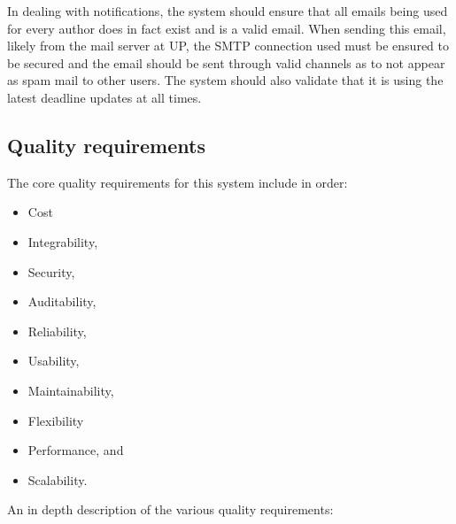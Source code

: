 \documentclass{article}
\begin{document}
	\par In dealing with notifications, the system should ensure that all emails being used for every author does in fact exist and is a valid email. When sending this email, likely from the mail server at UP, the SMTP connection used must be ensured to be secured and the email should be sent through valid channels as to not appear as spam mail to other users. The system should also validate that it is using the latest deadline updates at all times.
	
	
	\cleardoublepage
	
	\subsection{Quality requirements}\label{subsec:quality}
	
	The core quality requirements for this system include in order:
	
	\begin{itemize}
		\item Cost
		\item Integrability,
		\item Security,
		\item Auditability,
		\item Reliability,
		\item Usability,
		\item Maintainability,
		\item Flexibility
		\item Performance, and
		\item Scalability. \newline
	\end{itemize}
	
	An in depth description of the various quality requirements: \newline
	
\end{document}
